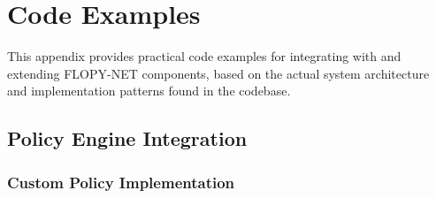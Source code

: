 \section{Code Examples}
\label{appendix:code-examples}

This appendix provides practical code examples for integrating with and extending FLOPY-NET components, based on the actual system architecture and implementation patterns found in the codebase.

\subsection{Policy Engine Integration}

\subsubsection{Custom Policy Implementation}

